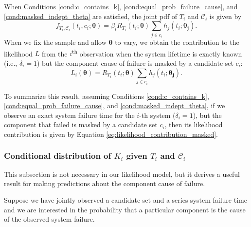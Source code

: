 \documentclass[
]{article}
\begin{document}
When Conditions \ref{cond:c_contains_k},
\ref{cond:equal_prob_failure_cause}, and \ref{cond:masked_indept_theta}
are satisfied, the joint pdf of \(T_i\) and \(\mathcal{C_i}\) is given
by \[
f_{T_i,\mathcal{C}_i}(t_i,c_i;\boldsymbol{\theta}) =
    \beta_i R_{T_i}(t_i;\boldsymbol{\theta})
    \sum_{j \in c_i} h_j(t_i;\boldsymbol{\theta_j}).
\] When we fix the sample and allow \(\boldsymbol{\theta}\) to vary, we
obtain the contribution to the likelihood \(L\) from the
\(i\)\textsuperscript{th} observation when the system lifetime is
exactly known (i.e., \(\delta_i = 1\)) but the component cause of
failure is masked by a candidate set \(c_i\): \begin{equation}
\label{eq:likelihood_contribution_masked}
L_i(\boldsymbol{\theta}) = R_{T_i}(t_i;\boldsymbol{\theta}) \sum_{j \in c_i} h_j(t_i;\boldsymbol{\theta_j}).
\end{equation}

To summarize this result, assuming Conditions \ref{cond:c_contains_k},
\ref{cond:equal_prob_failure_cause}, and \ref{cond:masked_indept_theta},
if we observe an exact system failure time for the \(i\)-th system
(\(\delta_i = 1\)), but the component that failed is masked by a
candidate set \(c_i\), then its likelihood contribution is given by
Equation \eqref{eq:likelihood_contribution_masked}.

\hypertarget{conditional-distribution-of-k_i-given-t_i-and-mathcalc_i}{%
\subsubsection{\texorpdfstring{Conditional distribution of \(K_i\) given
\(T_i\) and
\(\mathcal{C}_i\)}{Conditional distribution of K\_i given T\_i and \textbackslash mathcal\{C\}\_i}}\label{conditional-distribution-of-k_i-given-t_i-and-mathcalc_i}}

This subsection is not necessary in our likelihood model, but it derives
a useful result for making predictions about the component cause of
failure.

Suppose we have jointly observed a candidate set and a series system
failure time and we are interested in the probability that a particular
component is the cause of the observed system failure.
\end{document}
